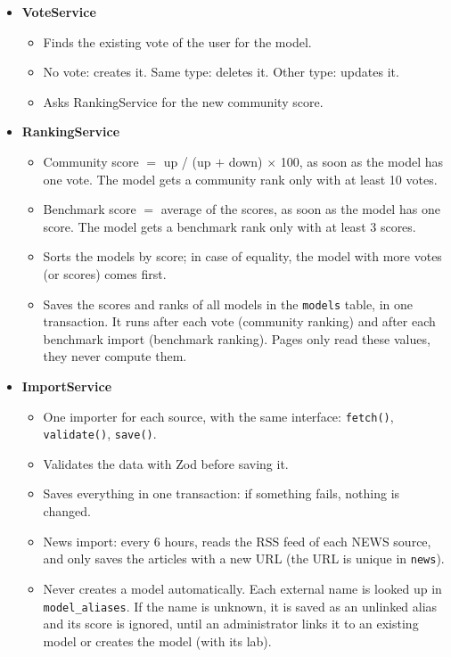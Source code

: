 \documentclass[11pt,a4paper]{article}
\begin{document}
\begin{itemize}
  \item \textbf{VoteService}
  \begin{itemize}
    \item Finds the existing vote of the user for the model.
    \item No vote: creates it. Same type: deletes it. Other type: updates it.
    \item Asks RankingService for the new community score.
  \end{itemize}
  \item \textbf{RankingService}
  \begin{itemize}
    \item Community score $=$ up / (up $+$ down) $\times$ 100, as soon as the model has one vote. The model gets a community rank only with at least 10 votes.
    \item Benchmark score $=$ average of the scores, as soon as the model has one score. The model gets a benchmark rank only with at least 3 scores.
    \item Sorts the models by score; in case of equality, the model with more votes (or scores) comes first.
    \item Saves the scores and ranks of all models in the \texttt{models} table, in one transaction. It runs after each vote (community ranking) and after each benchmark import (benchmark ranking). Pages only read these values, they never compute them.
  \end{itemize}
  \item \textbf{ImportService}
  \begin{itemize}
    \item One importer for each source, with the same interface: \texttt{fetch()}, \texttt{validate()}, \texttt{save()}.
    \item Validates the data with Zod before saving it.
    \item Saves everything in one transaction: if something fails, nothing is changed.
    \item News import: every 6 hours, reads the RSS feed of each NEWS source, and only saves the articles with a new URL (the URL is unique in \texttt{news}).
    \item Never creates a model automatically. Each external name is looked up in \texttt{model\_aliases}. If the name is unknown, it is saved as an unlinked alias and its score is ignored, until an administrator links it to an existing model or creates the model (with its lab).

\end{itemize}
\end{itemize}
\end{document}
